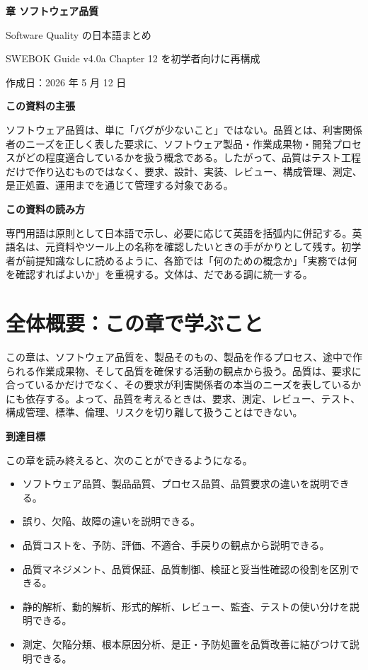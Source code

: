 \documentclass[11pt,a4paper]{article}
\begin{document}
{\Huge\bfseries{} 章 ソフトウェア品質\par}
{\Large Software Quality の日本語まとめ\par}
{\normalsize SWEBOK Guide v4.0a Chapter 12 を初学者向けに再構成\par}
{\normalsize 作成日：2026 年 5 月 12 日\par}

\begin{claimbox}
\textbf{この資料の主張}\par
ソフトウェア品質は、単に「バグが少ないこと」ではない。品質とは、利害関係者のニーズを正しく表した要求に、ソフトウェア製品・作業成果物・開発プロセスがどの程度適合しているかを扱う概念である。したがって、品質はテスト工程だけで作り込むものではなく、要求、設計、実装、レビュー、構成管理、測定、是正処置、運用までを通じて管理する対象である。
\end{claimbox}

\begin{claimbox}
\textbf{この資料の読み方}\par
専門用語は原則として日本語で示し、必要に応じて英語を括弧内に併記する。英語名は、元資料やツール上の名称を確認したいときの手がかりとして残す。初学者が前提知識なしに読めるように、各節では「何のための概念か」「実務では何を確認すればよいか」を重視する。文体は、だである調に統一する。
\end{claimbox}

\tableofcontents
\newpage

\section*{全体概要：この章で学ぶこと}
この章は、ソフトウェア品質を、製品そのもの、製品を作るプロセス、途中で作られる作業成果物、そして品質を確保する活動の観点から扱う。品質は、要求に合っているかだけでなく、その要求が利害関係者の本当のニーズを表しているかにも依存する。よって、品質を考えるときは、要求、測定、レビュー、テスト、構成管理、標準、倫理、リスクを切り離して扱うことはできない。

\textbf{到達目標}\par
この章を読み終えると、次のことができるようになる。
\begin{itemize}
  \item ソフトウェア品質、製品品質、プロセス品質、品質要求の違いを説明できる。
  \item 誤り、欠陥、故障の違いを説明できる。
  \item 品質コストを、予防、評価、不適合、手戻りの観点から説明できる。
  \item 品質マネジメント、品質保証、品質制御、検証と妥当性確認の役割を区別できる。
  \item 静的解析、動的解析、形式的解析、レビュー、監査、テストの使い分けを説明できる。
  \item 測定、欠陥分類、根本原因分析、是正・予防処置を品質改善に結びつけて説明できる。
\end{itemize}
\end{document}
